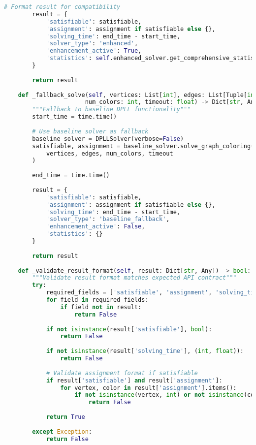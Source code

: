 \begin{lstlisting}[language=Python, caption=Interface Compatibility for Drop-in Replacement Operation]
        # Format result for compatibility
        result = {
            'satisfiable': satisfiable,
            'assignment': assignment if satisfiable else {},
            'solving_time': end_time - start_time,
            'solver_type': 'enhanced',
            'enhancement_active': True,
            'statistics': self.enhanced_solver.get_comprehensive_statistics()
        }
        
        return result
    
    def _fallback_solve(self, vertices: List[int], edges: List[Tuple[int, int]], 
                       num_colors: int, timeout: float) -> Dict[str, Any]:
        """Fallback to baseline DPLL functionality"""
        start_time = time.time()
        
        # Use baseline solver as fallback
        baseline_solver = DPLLSolver(verbose=False)
        satisfiable, assignment = baseline_solver.solve_graph_coloring(
            vertices, edges, num_colors, timeout
        )
        
        end_time = time.time()
        
        result = {
            'satisfiable': satisfiable,
            'assignment': assignment if satisfiable else {},
            'solving_time': end_time - start_time,
            'solver_type': 'baseline_fallback',
            'enhancement_active': False,
            'statistics': {}
        }
        
        return result
    
    def _validate_result_format(self, result: Dict[str, Any]) -> bool:
        """Validate result format matches expected API contract"""
        try:
            required_fields = ['satisfiable', 'assignment', 'solving_time']
            for field in required_fields:
                if field not in result:
                    return False
            
            if not isinstance(result['satisfiable'], bool):
                return False
            
            if not isinstance(result['solving_time'], (int, float)):
                return False
            
            # Validate assignment format if satisfiable
            if result['satisfiable'] and result['assignment']:
                for vertex, color in result['assignment'].items():
                    if not isinstance(vertex, int) or not isinstance(color, int):
                        return False
            
            return True
            
        except Exception:
            return False
\end{lstlisting}

